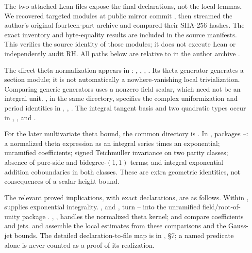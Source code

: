 \documentclass[11pt,a4paper]{article}
\theoremstyle{definition}\newtheorem{remark}[theorem]{Remark}
\begin{document}
The two attached Lean files expose the final declarations, not the local lemmas. We recovered targeted modules at public mirror commit , then streamed the author's original fourteen-part archive and compared their SHA-256 hashes. The exact inventory and byte-equality results are included in the source manifests. This verifies the source identity of those modules; it does not execute Lean or independently audit RH. All paths below are relative to  in the author archive \cite{AlpogeSource}.

The direct theta normalization appears in : , , , . Its theta generator generates a section module; it is not automatically a nowhere-vanishing local trivialization. Comparing generic generators uses a nonzero field scalar, which need not be an integral unit. , in the same directory, specifies the complex uniformization and period identities in , , . The integral tangent basis and two quadratic types occur in , ,  and .

For the later multivariate theta bound, the common directory is . In ,  packages --: a normalized theta expression as an integral series times an exponential; unramified coefficients; signed Teichm\"uller invariance on two parity classes; absence of pure-side and bidegree-$(1,1)$ terms; and integral exponential addition coboundaries in both classes. These are extra geometric identities, not consequences of a scalar height bound.

The relevant proved implications, with exact declarations, are as follows. Within ,  supplies exponential integrality. ,  and , turn -- into the unramified field/root-of-unity package . , , handles the normalized theta kernel;  and  compare coefficients and jets.  and  assemble the local estimates from these comparisons and the Gauss-jet bounds. The detailed declaration-to-file map is in , \S7; a named predicate alone is never counted as a proof of its realization.
\end{document}
